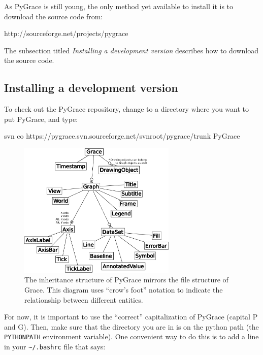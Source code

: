 As PyGrace is still young, the only method yet available to install it
is to download the source code from:

\begin{command}
http://sourceforge.net/projects/pygrace
\end{command}

\noindent
The subsection titled \textit{Installing a development version}
describes how to download the source code.

\subsection*{Installing a development version}

\begin{flushleft}

To check out the PyGrace repository, change to a directory where you
want to put PyGrace, and type:

\begin{command}
svn co https://pygrace.svn.sourceforge.net/svnroot/pygrace/trunk
PyGrace
\end{command}

\begin{figure}[t!]
  \centering
  \includegraphics[width=0.67\textwidth]{../Diagrams/crow_diagram.pdf}
  \caption{
%
The inheritance structure of PyGrace mirrors the file structure of
Grace.  This diagram uses ``crow's foot'' notation to indicate the
relationship between different entities.
%
  }
  \label{crowdiagram}
\end{figure}

For now, it is important to use the ``correct'' capitalization of
PyGrace (capital P and G).  Then, make sure that the directory you are
in is on the python path (the {\tt PYTHONPATH} environment variable).
One convenient way to do this is to add a line in your
{\tt \textasciitilde/.bashrc} file that says:


\end{flushleft}
